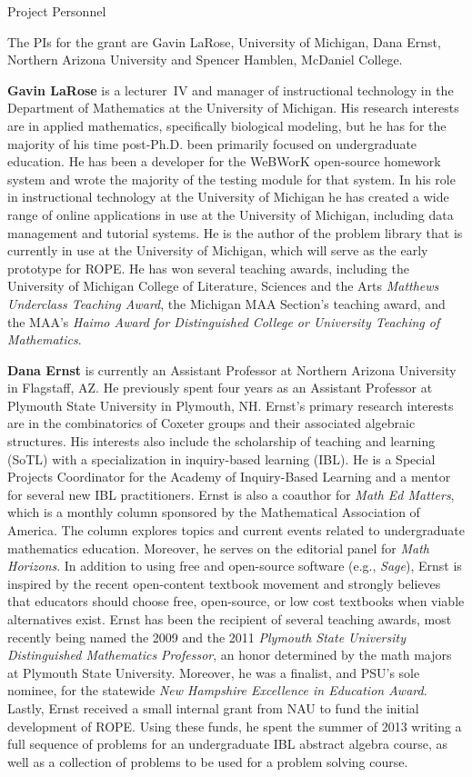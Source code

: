 \documentclass[11pt]{article}
\begin{document}
\begin{section}{Project Personnel}

The PIs for 
the grant are Gavin LaRose, University of Michigan, Dana
Ernst, Northern Arizona University and Spencer Hamblen, McDaniel College.

\textbf{Gavin LaRose} is a lecturer~IV and manager of instructional
technology in the Department of Mathematics at the University of Michigan.
His research interests are in applied mathematics, specifically biological
modeling, but he has for the majority of his time post-Ph.D. been
primarily focused on undergraduate education.  He has been a developer for
the WeBWorK open-source homework system and wrote the majority of the
testing module for that system.  In his role in instructional technology
at the University of Michigan he has created a wide range of online
applications in use at the University of Michigan, including data
management and tutorial systems.  He is the author of the problem library
that is currently in use at the University of Michigan, which will serve
as the early prototype for ROPE.  He has won several teaching awards,
including the University of Michigan College of Literature, Sciences
and the Arts \emph{Matthews Underclass Teaching Award}, the Michigan
MAA Section's teaching award, and the MAA's \emph{Haimo Award for
Distinguished College or University Teaching of Mathematics}.

\textbf{Dana Ernst} is currently an Assistant Professor at Northern
Arizona University in Flagstaff, AZ. He previously spent four years as an
Assistant Professor at Plymouth State University in Plymouth, NH. Ernst's
primary research interests are in the combinatorics of Coxeter groups and
their associated algebraic structures.  His interests also include the
scholarship of teaching and learning (SoTL) with a specialization in
inquiry-based learning (IBL). He is a Special Projects Coordinator for the
Academy of Inquiry-Based Learning and a mentor for several new IBL
practitioners. Ernst is also a coauthor for \emph{Math Ed Matters}, which
is a monthly column sponsored by the Mathematical Association of
America. The column explores topics and current events related to
undergraduate mathematics education. Moreover, he serves on the editorial
panel for \emph{Math Horizons}.  In addition to using free and open-source 
software (e.g., \emph{Sage}), Ernst is inspired by the recent
open-content textbook movement and strongly believes that educators should
choose free, open-source, or low cost textbooks when viable alternatives
exist.  Ernst has been the recipient of several teaching awards, most
recently being named the 2009 and the 2011 \emph{Plymouth State University
Distinguished Mathematics Professor}, an honor determined by the math
majors at Plymouth State University.  Moreover, he was a
finalist, and PSU's sole nominee, for the statewide \emph{New Hampshire
Excellence in Education Award}.  Lastly, Ernst received a small internal grant from NAU to fund the initial development of ROPE.  Using these funds, he spent the summer of 2013 writing a full sequence of problems for an undergraduate IBL abstract algebra course, as well as a collection of problems to be used for a problem solving course.


\end{section}
\end{document}
